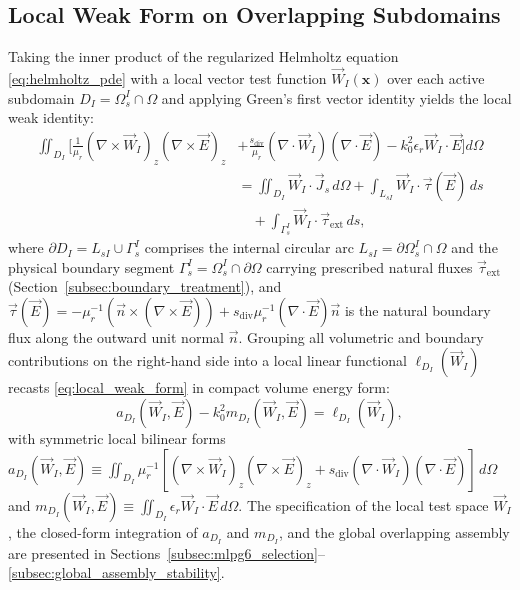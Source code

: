 \documentclass[VANCOUVER]{USG}
\begin{document}
\subsection{Local Weak Form on Overlapping Subdomains}
\label{subsec:local_weak_form}

Taking the inner product of the regularized Helmholtz equation \eqref{eq:helmholtz_pde} with a local vector test function $\vec{W}_I(\mathbf{x})$ over each active subdomain $D_I = \Omega_s^I \cap \Omega$ and applying Green's first vector identity yields the local weak identity:
\begin{equation}
    \begin{aligned}
        \iint_{D_I} \bigg[ \frac{1}{\mu_r} (\nabla \times \vec{W}_I)_z (\nabla \times \vec{E})_z & + \frac{s_{\mathrm{div}}}{\mu_r} (\nabla \cdot \vec{W}_I) (\nabla \cdot \vec{E}) - k_0^2 \epsilon_r \vec{W}_I \cdot \vec{E} \bigg] d\Omega \\
                                                                                                    & = \iint_{D_I} \vec{W}_I \cdot \vec{J}_s \, d\Omega + \int_{L_{sI}} \vec{W}_I \cdot \vec{\tau}(\vec{E}) \, ds \\
                                                                                                    & \quad + \int_{\Gamma_s^I} \vec{W}_I \cdot \vec{\tau}_{\mathrm{ext}} \, ds,
    \end{aligned}
    \label{eq:local_weak_form}
\end{equation}
where $\partial D_I = L_{sI} \cup \Gamma_s^I$ comprises the internal circular arc $L_{sI} = \partial\Omega_s^I \cap \Omega$ and the physical boundary segment $\Gamma_s^I = \Omega_s^I \cap \partial\Omega$ carrying prescribed natural fluxes $\vec{\tau}_{\mathrm{ext}}$ (Section~\ref{subsec:boundary_treatment}), and $\vec{\tau}(\vec{E}) = -\mu_r^{-1}(\vec{n} \times (\nabla \times \vec{E})) + s_{\mathrm{div}}\mu_r^{-1}(\nabla \cdot \vec{E})\vec{n}$ is the natural boundary flux along the outward unit normal $\vec{n}$. Grouping all volumetric and boundary contributions on the right-hand side into a local linear functional $\ell_{D_I}(\vec{W}_I)$ recasts \eqref{eq:local_weak_form} in compact volume energy form:
\begin{equation}
    a_{D_I}(\vec{W}_I, \vec{E}) - k_0^2 m_{D_I}(\vec{W}_I, \vec{E}) = \ell_{D_I}(\vec{W}_I),
    \label{eq:volume_energy_form}
\end{equation}
with symmetric local bilinear forms $a_{D_I}(\vec{W}_I, \vec{E}) \equiv \iint_{D_I} \mu_r^{-1}[(\nabla \times \vec{W}_I)_z (\nabla \times \vec{E})_z + s_{\mathrm{div}}(\nabla \cdot \vec{W}_I)(\nabla \cdot \vec{E})]\,d\Omega$ and $m_{D_I}(\vec{W}_I, \vec{E}) \equiv \iint_{D_I} \epsilon_r \vec{W}_I \cdot \vec{E}\,d\Omega$.
The specification of the local test space $\vec{W}_I$, the closed-form integration of $a_{D_I}$ and $m_{D_I}$, and the global overlapping assembly are presented in Sections~\ref{subsec:mlpg6_selection}--\ref{subsec:global_assembly_stability}.
\end{document}
